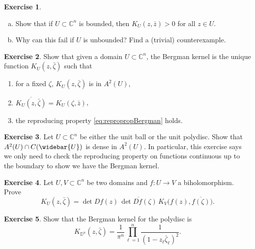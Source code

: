 \documentclass[12pt,openany]{book}
\newcommand{\C}{{\mathbb{C}}}
\newcommand{\D}{{\mathbb{D}}}
\theoremstyle{plain}
\theoremstyle{remark}
\theoremstyle{definition}
\newenvironment{exbox}{%
    \def\FrameCommand{\vrule width 1pt \relax\hspace{10pt}}%
    \MakeFramed{\advance\hsize-\width\FrameRestore}%
}{%
    \endMakeFramed
}
\newenvironment{exparts}{%
    \leavevmode\begin{enumerate}[a),noitemsep,topsep=0pt,parsep=0pt,partopsep=0pt]
}{%
    \end{enumerate}
}
\newenvironment{exnumparts}{%
    \leavevmode\begin{enumerate}[1),noitemsep,topsep=0pt,parsep=0pt,partopsep=0pt]
}{%
    \end{enumerate}
}
\theoremstyle{exercise}
\newtheorem{exercise}{Exercise}[section]
\theoremstyle{example}
\begin{document}
\begin{exbox}
\begin{exercise}
\begin{exparts}
\item
Show that if $U \subset \C^n$ is bounded, then
$K_U(z,\bar{z}) > 0$
for all $z \in U$.
\item
Why can this fail if $U$ is unbounded?
Find a (trivial) counterexample.
\end{exparts}
\end{exercise}

\begin{exercise} \label{exercise:Bergmanunique}
Show that given a domain $U \subset \C^n$, the Bergman kernel is the unique
function $K_U(z,\bar{\zeta})$ such that
\begin{exnumparts}
\item
for a fixed $\zeta$, $K_U(z,\bar{\zeta})$ is in $A^2(U)$,
\item
$\overline{K_U(z,\bar{\zeta})} =
K_U(\zeta,\bar{z})$,
\item
the reproducing property \eqref{eq:repropropBergman}
holds.
\end{exnumparts}
\end{exercise}

\begin{exercise}
Let $U \subset \C^n$ be either the unit ball or the unit polydisc.
Show that
$A^2(U) \cap C(\widebar{U})$ is dense in $A^2(U)$.  In particular, this
exercise says we
only need to check the reproducing property on functions continuous up to
the boundary to show we have the Bergman kernel.
\end{exercise}

\begin{exercise}
Let $U, V \subset \C^n$ be two domains and $f \colon U \to V$ a
biholomorphism.  Prove
\begin{equation*}
K_U(z,\bar{\zeta}) = \det D f(z) \, \overline{\det D f (\zeta)} \,
K_V\bigl(f(z),\overline{f(\zeta)}\bigr) .
\end{equation*}
\end{exercise}

\begin{exercise}
Show that the Bergman kernel for the polydisc is
\begin{equation*}
K_{\D^n}(z,\bar{\zeta}) =
\frac{1}{\pi^n} \prod_{\ell=1}^n \frac{1}{{(1-z_\ell\bar{\zeta}_\ell)}^2}.
\end{equation*}
\end{exercise}


\end{exbox}
\end{document}
